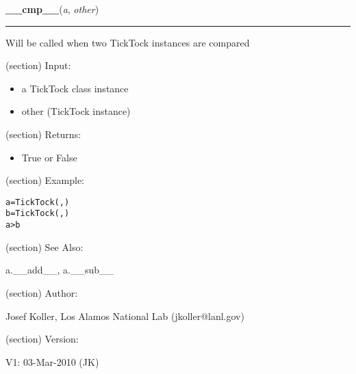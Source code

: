 \hspace{.8\funcindent}\begin{boxedminipage}{\funcwidth}

    \raggedright \textbf{\_\_cmp\_\_}(\textit{a}, \textit{other})

    \vspace{-1.5ex}

    \rule{\textwidth}{0.5\fboxrule}
\setlength{\parskip}{2ex}
    Will be called when two TickTock instances are compared

    (section) Input:

      \begin{itemize}
      \setlength{\parskip}{0.6ex}
        \item a TickTock class instance

        \item other (TickTock instance)

      \end{itemize}

    (section) Returns:

      \begin{itemize}
      \setlength{\parskip}{0.6ex}
        \item True or False

      \end{itemize}

    (section) Example:

\begin{alltt}
\pysrcprompt{{\textgreater}{\textgreater}{\textgreater} }a = TickTock(, )
\pysrcprompt{{\textgreater}{\textgreater}{\textgreater} }b = TickTock(, )
\pysrcprompt{{\textgreater}{\textgreater}{\textgreater} }a {\textgreater} b
\end{alltt}
    (section) See Also:

      a.\_\_add\_\_, a.\_\_sub\_\_

    (section) Author:

      Josef Koller, Los Alamos National Lab (jkoller@lanl.gov)

    (section) Version:

      V1: 03-Mar-2010 (JK)

\setlength{\parskip}{1ex}
    \end{boxedminipage}

    \label{spacepy:spacetime:TickTock:__gt__}


